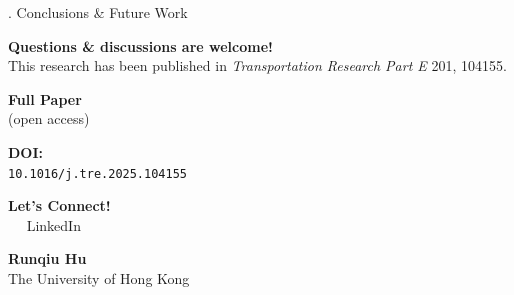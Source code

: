 \begin{block}{\fontsize{46}{54}. Conclusions \& Future Work}
\begin{minipage}[t]{0.54\linewidth}
        \colorbox{AccentGold!20}{%
            \parbox{0.96\linewidth}{%
                \centering
                \vspace{0.5cm}
                {\fontsize{44}{52}\selectfont \textbf{Questions \& discussions are welcome!}}\\[0.4cm]
                {\fontsize{32}{40}\selectfont This research has been published in \textit{Transportation Research Part E} 201, 104155.}
                \vspace{0.5cm}
            }%
        }
    \end{minipage}%
    \hfill
    \begin{minipage}[t]{0.44\linewidth}
        \vspace{0pt}
        \centering
        
        \begin{minipage}[t]{0.48\linewidth}
            \centering
            {\fontsize{36}{44}\selectfont \textbf{Full Paper}}\\[0.2cm]
            {\fontsize{28}{34}\selectfont (open access)}
            
            \vspace{0.4cm}
            
            \vspace{0.4cm}
            {\fontsize{26}{32}\selectfont \textbf{DOI:}}\\[0.15cm]
            {\fontsize{24}{30}\selectfont \texttt{10.1016/j.tre.2025.104155}}
        \end{minipage}%
        \hfill
        \begin{minipage}[t]{0.48\linewidth}
            \centering
            {\fontsize{36}{44}\selectfont \textbf{Let's Connect!}}\\[0.2cm]
            {\fontsize{28}{34}\selectfont \faLinkedin~~ LinkedIn}
            
            \vspace{0.4cm}
            
            \vspace{0.4cm}
            {\fontsize{26}{32}\selectfont \textbf{Runqiu Hu}}\\[0.15cm]
            {\fontsize{24}{30}\selectfont The University of Hong Kong}
        \end{minipage}
        

\end{minipage}
\end{block}
